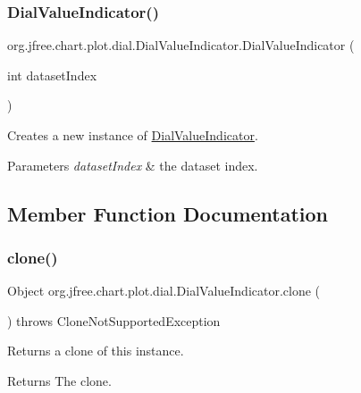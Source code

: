 \subsubsection{\texorpdfstring{Dial\+Value\+Indicator()}{DialValueIndicator()}\hspace{0.1cm}{\footnotesize\ttfamily [2/2]}}
{\footnotesize\ttfamily org.\+jfree.\+chart.\+plot.\+dial.\+Dial\+Value\+Indicator.\+Dial\+Value\+Indicator (\begin{DoxyParamCaption}\item[{int}]{dataset\+Index }\end{DoxyParamCaption})}

Creates a new instance of {\ttfamily \mbox{\hyperlink{classorg_1_1jfree_1_1chart_1_1plot_1_1dial_1_1_dial_value_indicator}{Dial\+Value\+Indicator}}}.


\begin{DoxyParams}{Parameters}
{\em dataset\+Index} & the dataset index. \\
\hline
\end{DoxyParams}


\subsection{Member Function Documentation}
\mbox{\label{classorg_1_1jfree_1_1chart_1_1plot_1_1dial_1_1_dial_value_indicator_ac427cac9267afdeb41245cb4fce845a7}} 
\subsubsection{\texorpdfstring{clone()}{clone()}}
{\footnotesize\ttfamily Object org.\+jfree.\+chart.\+plot.\+dial.\+Dial\+Value\+Indicator.\+clone (\begin{DoxyParamCaption}{ }\end{DoxyParamCaption}) throws Clone\+Not\+Supported\+Exception}

Returns a clone of this instance.

\begin{DoxyReturn}{Returns}
The clone.
\end{DoxyReturn}

